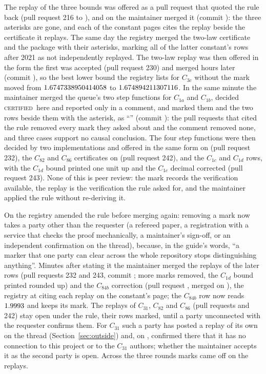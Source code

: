 \documentclass[preprint,11pt,authoryear,a4paper]{elsarticle}
\newcommand{\vword}[1]{{\normalfont\scshape #1}}
\newcommand{\vC}{\vword{certified}}
\begin{document}
The replay of the three bounds was offered as a pull request that quoted the rule back (pull request 216 to \citealp{OptConst}), and on \MtRgMergeDate{} the maintainer merged it (commit \MtRgMergeCommit): the three asterisks are gone, and each of the \MtRgPages{} constant pages cites the replay beside the certificate it replays. The same day the registry merged the two-law certificate and the package with their asterisks, marking all \MtRgStarRows{} of the latter constant's rows after 2021 as not independently replayed. The two-law replay was then offered in the form the first was accepted (pull request 230) and merged \MtRgSecondHours{} hours later (commit \MtRgSecondCommit), so the best lower bound the registry lists for $C_{3c}$ without the mark moved from $1.6747338950414058$ to $1.674894211307116$. In the same minute the maintainer merged the queue's two step functions for $C_{1a}$ and $C_{1b}$, decided \vC\ here and reported only in a comment, and marked them and the two rows beside them with the asterisk, as ``\MtRgStarReason'' (commit \MtRgStarCommit): the pull requests that cited the rule removed every mark they asked about and the comment removed none, and three cases support no causal conclusion. The four step functions were then decided by two implementations and offered in the same form on \MtSfPrDate{} (pull request 232), the $C_{82}$ and $C_{86}$ certificates on \MtCeDate{} (pull request 242), and the $C_{1c}$ and $C_{1d}$ rows, with the $C_{1d}$ bound printed one unit up and the $C_{1c}$ decimal corrected (pull request 243). None of this is peer review: the mark records the verification available, the replay is the verification the rule asked for, and the maintainer applied the rule without re-deriving it.

On \MtRgThirdDate{} the registry amended the rule before merging again: removing a mark now takes a party other than the requester (a refereed paper, a registration with a service that checks the proof mechanically, a maintainer's sign-off, or an independent confirmation on the thread), because, in the guide's words, ``a marker that one party can clear across the whole repository stops distinguishing anything''. Minutes after stating it the maintainer merged the replays of the later rows (pull requests 232 and 243, commit \MtRgThirdCommit; \MtRgThirdMarksWord{} more marks removed, the $C_{1d}$ bound printed rounded up) and the $C_{84b}$ correction (pull request \OcSpPr, merged on \OcSpMerged), the registry at \MtRgThirdRegistryCommit{} citing each replay on the constant's page; the $C_{84b}$ row now reads $1.9993$ and keeps its mark. The replays of $C_{31}$, $C_{82}$ and $C_{86}$ (pull requests \OcLuOurPr{} and 242) stay open under the rule, their rows marked, until a party unconnected with the requester confirms them. For $C_{31}$ such a party has posted a replay of its own on the thread (Section~\ref{sec:outside}) and, on \OcOutLuIndependent, confirmed there that it has no connection to this project or to the $C_{31}$ authors; whether the maintainer accepts it as the second party is open. Across the three rounds \MtRgMarksTotalWord{} marks came off on the replays.
\end{document}
